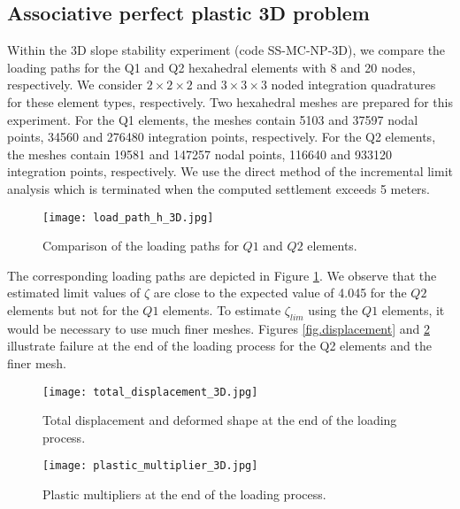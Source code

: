 \documentclass[a4paper,12pt]{article}
\theoremstyle{remark}
\numberwithin{equation}{section}
\begin{document}
\subsection{Associative perfect plastic 3D problem}

Within the 3D slope stability experiment (code  SS-MC-NP-3D), we compare the loading paths for the Q1 and Q2 hexahedral elements with 8 and 20 nodes, respectively. We consider $2\times 2\times 2$ and $3\times 3\times 3$ noded integration quadratures for these element types, respectively. Two hexahedral meshes are prepared for this experiment. For the Q1 elements, the meshes contain 5103 and 37597 nodal points, 34560 and 276480 integration points, respectively. For the Q2 elements, the meshes contain 19581 and 147257 nodal points, 116640 and 933120 integration points, respectively. We use the direct method of the incremental limit analysis which is terminated when the computed settlement exceeds 5 meters.

\begin{figure}[htbp]
\center
  \texttt{[image: load\_path\_h\_3D.jpg]}
   \caption{\small{Comparison of the loading paths for $Q1$ and $Q2$ elements.}}
   \label{fig.load_path_3D}
\end{figure}

The corresponding loading paths are depicted in Figure \ref{fig.load_path_3D}. We observe that the estimated limit values of $\zeta$ are close to the expected value of 4.045 for the $Q2$ elements but not for the $Q1$ elements. To estimate $\zeta_{lim}$ using the $Q1$ elements, it would be necessary to use much finer meshes. Figures \ref{fig.displacement} and \ref{fig.multiplier} illustrate failure at the end of the loading process for the Q2 elements and the finer mesh. 

\begin{figure}[htbp]
\begin{minipage}[t]{0.47\textwidth}
  \center
  \texttt{[image: total\_displacement\_3D.jpg]}
   \caption{\small{Total displacement and deformed shape at the end of the loading process.}}
   \label{fig.displacement}
\end{minipage}
\hfill
\begin{minipage}[t]{0.47\textwidth}
  \center
   \texttt{[image: plastic\_multiplier\_3D.jpg]}
   \caption{\small{Plastic multipliers at the end of the loading process.}}
   \label{fig.multiplier}
\end{minipage}
\end{figure}
\end{document}
